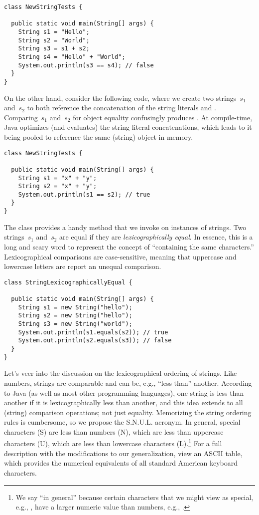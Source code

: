 \begin{lstlisting}[language=MyJava]
class NewStringTests {

  public static void main(String[] args) {
    String s1 = "Hello";
    String s2 = "World";
    String s3 = s1 + s2;
    String s4 = "Hello" + "World";
    System.out.println(s3 == s4); // false
  }
}
\end{lstlisting}

On the other hand, consider the following code, where we create two strings~$s_1$ and~$s_2$ to both reference the concatenation of the string literals  and . 
Comparing~$s_1$ and~$s_2$ for object equality confusingly produces .
At compile-time, Java optimizes (and evaluates) the string literal concatenations, which leads to it being pooled to reference the same (string) object in memory.

\begin{lstlisting}[language=MyJava]
class NewStringTests {

  public static void main(String[] args) {
    String s1 = "x" + "y";
    String s2 = "x" + "y";
    System.out.println(s1 == s2); // true
  }
}
\end{lstlisting}

The  class provides a handy  method that we invoke on instances of strings. 
Two strings~$s_1$ and~$s_2$ are equal if they are \emph{lexicographically equal}. 
In essence, this is a long and scary word to represent the concept of ``containing the same characters.'' 
Lexicographical comparisons are case-sensitive, meaning that uppercase and lowercase letters are report an unequal comparison.

\begin{lstlisting}[language=MyJava]
class StringLexicographicallyEqual {

  public static void main(String[] args) {
    String s1 = new String("hello");
    String s2 = new String("hello");
    String s3 = new String("world");
    System.out.println(s1.equals(s2)); // true
    System.out.println(s2.equals(s3)); // false
  }
}
\end{lstlisting}

Let's veer into the discussion on the lexicographical ordering of strings. 
Like numbers, strings are comparable and can be, e.g., ``less than'' another. 
According to Java (as well as most other programming languages), one string is less than another if it is lexicographically less than another, and this idea extends to all (string) comparison operations; not just equality. 
Memorizing the string ordering rules is cumbersome, so we propose the S.N.U.L. acronym. 
In general, special characters (S) are less than numbers (N), which are less than uppercase characters (U), which are less than lowercase characters (L).\footnote{We say ``in general'' because certain characters that we might view as special, e.g., , have a larger numeric value than numbers, e.g., \ttt{\q{}2\q{}}.} 
For a full description with the modifications to our generalization, view an ASCII table, which provides the numerical equivalents of all standard American keyboard characters. 

